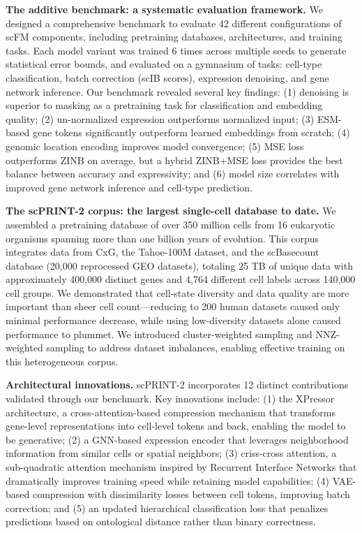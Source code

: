 \textbf{The additive benchmark: a systematic evaluation framework.} We designed a comprehensive benchmark to evaluate 42 different configurations of \gls{scFM} components, including pretraining databases, architectures, and training tasks. Each model variant was trained 6 times across multiple seeds to generate statistical error bounds, and evaluated on a gymnasium of tasks: cell-type classification, batch correction (\gls{scIB} scores), expression denoising, and gene network inference. Our benchmark revealed several key findings: (1) denoising is superior to masking as a pretraining task for classification and embedding quality; (2) un-normalized expression outperforms normalized input; (3) \gls{ESM}-based gene tokens significantly outperform learned embeddings from scratch; (4) genomic location encoding improves model convergence; (5) \gls{MSE} loss outperforms \gls{ZINB} on average, but a hybrid \gls{ZINB}+MSE loss provides the best balance between accuracy and expressivity; and (6) model size correlates with improved gene network inference and cell-type prediction.

\textbf{The \gls{scPRINT}-2 corpus: the largest single-cell database to date.} We assembled a pretraining database of over 350 million cells from 16 eukaryotic organisms spanning more than one billion years of evolution. This corpus integrates data from \gls{CxG}, the Tahoe-100M dataset, and the scBasecount database (20,000 reprocessed \gls{GEO} datasets), totaling 25 TB of unique data with approximately 400,000 distinct genes and 4,764 different cell labels across 140,000 cell groups. We demonstrated that cell-state diversity and data quality are more important than sheer cell count---reducing to 200 human datasets caused only minimal performance decrease, while using low-diversity datasets alone caused performance to plummet. We introduced cluster-weighted sampling and \gls{NNZ}-weighted sampling to address dataset imbalances, enabling effective training on this heterogeneous corpus.

\textbf{Architectural innovations.} \gls{scPRINT}-2 incorporates 12 distinct contributions validated through our benchmark. Key innovations include: (1) the XPressor architecture, a cross-attention-based compression mechanism that transforms gene-level representations into cell-level tokens and back, enabling the model to be generative; (2) a \gls{GNN}-based expression encoder that leverages neighborhood information from similar cells or spatial neighbors; (3) criss-cross attention, a sub-quadratic attention mechanism inspired by Recurrent Interface Networks that dramatically improves training speed while retaining model capabilities; (4) \gls{VAE}-based compression with dissimilarity losses between cell tokens, improving batch correction; and (5) an updated hierarchical classification loss that penalizes predictions based on ontological distance rather than binary correctness.

